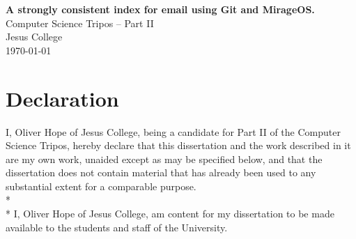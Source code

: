 \documentclass[12pt,a4paper,twoside,openright]{report}
\begin{document}

\thispagestyle{empty}



\vspace*{60mm}
\begin{center}
\Huge
\textbf{A strongly consistent index for email using Git and MirageOS.} \\[5mm]
Computer Science Tripos -- Part II \\[5mm]
Jesus College \\[5mm]
\today  %
\end{center}


\pagestyle{plain}

\newpage

\setcounter{page}{1}

\section*{Declaration}

I, Oliver Hope of Jesus College, being a candidate for Part II of the Computer Science Tripos, hereby declare that this dissertation and the work described in it are my own work, unaided except as may be specified below, and that the dissertation does not contain material that has already been used to any substantial extent for a comparable purpose.
\\*
\\*
I, Oliver Hope of Jesus College,
am content for my dissertation to be made available to the students and staff of the University.

\bigskip
{}
\end{document}
